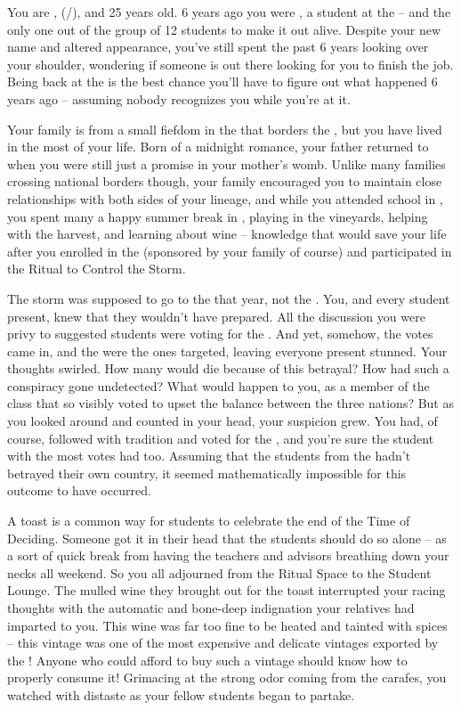 \documentclass[char]{GL2020}
\begin{document}
\name{\cAssistantScientist{}}

You are \cAssistantScientist{\full}, (\cAssistantScientist{\they}/\cAssistantScientist{\them}), and 25 years old. 6 years ago you were \cKidScientist{\full}, a student at the \pSc{} -- and the only one out of the group of 12 students to make it out alive. Despite your new name and altered appearance, you've still spent the past 6 years looking over your shoulder, wondering if someone is out there looking for you to finish the job. Being back at the \pSc{} is the best chance you'll have to figure out what happened 6 years ago -- assuming nobody recognizes you while you're at it.

Your family is from a small fiefdom in the \pFarm{} that borders the \pTech{}, but you have lived in the \pTech{} most of your life. Born of a midnight romance, your father returned to \pTech{} when you were still just a promise in your mother's womb. Unlike many families crossing national borders though, your family encouraged you to maintain close relationships with both sides of your lineage, and while you attended school in \pTech{}, you spent many a happy summer break in \pFarm{}, playing in the vineyards, helping with the harvest, and learning about wine -- knowledge that would save your life after you enrolled in the \pSc{} (sponsored by your \pFarm{} family of course) and participated in the Ritual to Control the Storm.

The storm was supposed to go to the \pTech{} that year, not the \pShip{}. You, and every student present, knew that they wouldn't have prepared. All the discussion you were privy to suggested students were voting for the \pTech{}. And yet, somehow, the votes came in, and the \pShip{} were the ones targeted, leaving everyone present stunned. Your thoughts swirled. How many would die because of this betrayal? How had such a conspiracy gone undetected? What would happen to you, as a member of the class that so visibly voted to upset the balance between the three nations? But as you looked around and counted in your head, your suspicion grew.  You had, of course, followed with tradition and voted for the \pTech{}, and you're sure the \pFarm{} student with the most votes had too. Assuming that the students from the \pShip{} hadn't betrayed their own country, it seemed mathematically impossible for this outcome to have occurred.

A toast is a common way for students to celebrate the end of the Time of Deciding. Someone got it in their head that the students should do so alone – as a sort of quick break from having the teachers and advisors breathing down your necks all weekend. So you all adjourned from the Ritual Space to the Student Lounge. The mulled wine they brought out for the toast interrupted your racing thoughts with the automatic and bone-deep indignation your \pFarm{} relatives had imparted to you. This wine was far too fine to be heated and tainted with spices -- this vintage was one of the most expensive and delicate vintages exported by the \pFarm{}! Anyone who could afford to buy such a vintage should know how to properly consume it! Grimacing at the strong odor coming from the carafes, you watched with distaste as your fellow students began to partake.
\end{document}
